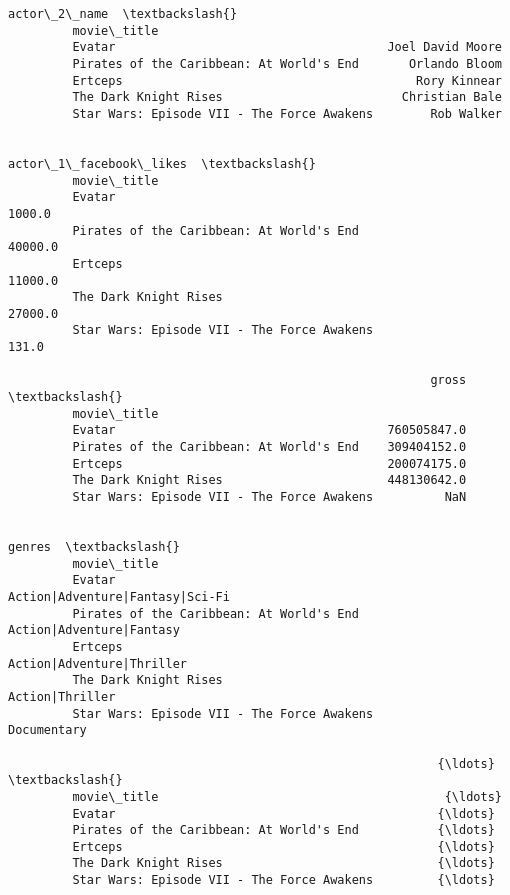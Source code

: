 \documentclass[11pt]{article}
\begin{document}
\begin{Verbatim}[commandchars=\\\{\}]
                                                         actor\_2\_name  \textbackslash{}
         movie\_title                                                    
         Evatar                                      Joel David Moore   
         Pirates of the Caribbean: At World's End       Orlando Bloom   
         Ertceps                                         Rory Kinnear   
         The Dark Knight Rises                         Christian Bale   
         Star Wars: Episode VII - The Force Awakens        Rob Walker   
         
                                                     actor\_1\_facebook\_likes  \textbackslash{}
         movie\_title                                                          
         Evatar                                                      1000.0   
         Pirates of the Caribbean: At World's End                   40000.0   
         Ertceps                                                    11000.0   
         The Dark Knight Rises                                      27000.0   
         Star Wars: Episode VII - The Force Awakens                   131.0   
         
                                                           gross  \textbackslash{}
         movie\_title                                               
         Evatar                                      760505847.0   
         Pirates of the Caribbean: At World's End    309404152.0   
         Ertceps                                     200074175.0   
         The Dark Knight Rises                       448130642.0   
         Star Wars: Episode VII - The Force Awakens          NaN   
         
                                                                              genres  \textbackslash{}
         movie\_title                                                                   
         Evatar                                      Action|Adventure|Fantasy|Sci-Fi   
         Pirates of the Caribbean: At World's End           Action|Adventure|Fantasy   
         Ertceps                                           Action|Adventure|Thriller   
         The Dark Knight Rises                                       Action|Thriller   
         Star Wars: Episode VII - The Force Awakens                      Documentary   
         
                                                            {\ldots}           \textbackslash{}
         movie\_title                                        {\ldots}            
         Evatar                                             {\ldots}            
         Pirates of the Caribbean: At World's End           {\ldots}            
         Ertceps                                            {\ldots}            
         The Dark Knight Rises                              {\ldots}            
         Star Wars: Episode VII - The Force Awakens         {\ldots}            
         

\end{Verbatim}
\end{document}
